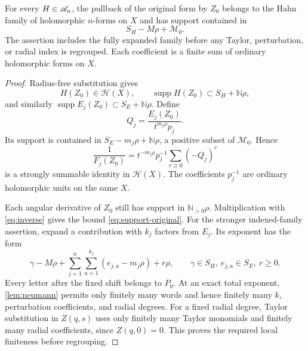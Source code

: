 \documentclass[11pt,letterpaper]{article}
\theoremstyle{definition}
\theoremstyle{remark}
\newcommand{\N}{\mathbb N}\newcommand{\Z}{\mathbb Z}\newcommand{\Q}{\mathbb Q}
\newcommand{\HH}{\mathscr H}\newcommand{\FF}{\mathscr F}
\newcommand{\supp}{\operatorname{supp}}\newcommand{\CT}{\operatorname{CT}}
\numberwithin{equation}{section}
\begin{document}
\begin{proposition}\label{prop:admissible}
For every $H\in\mathscr A_n$, the pullback of the original form by $Z_0$ belongs to
the Hahn family of holomorphic $n$-forms on $X$ and has support contained in
\begin{equation}\label{eq:support-original}
 S_H-M\rho+\mathcal M_0.
\end{equation}
The assertion includes the fully expanded family before any Taylor,
perturbation, or radial index is regrouped. Each coefficient is a finite sum
of ordinary holomorphic forms on $X$.
\end{proposition}
\begin{proof}
Radius-free substitution gives
\[
 H(Z_0)\in\HH(X),\qquad
 \supp H(Z_0)\subset S_H+\N\rho,
\]
and similarly $\supp E_j(Z_0)\subset S_E+\N\rho$. Define
\[
 Q_j=\frac{E_j(Z_0)}{t^{m_j\rho}p_j}.
\]
Its support is contained in $S_E-m_j\rho+\N\rho$, a positive subset of
$\mathcal M_0$. Hence
\begin{equation}\label{eq:inverse}
 \frac1{F_j(Z_0)}
 =t^{-m_j\rho}p_j^{-1}\sum_{r\geq0}(-Q_j)^r
\end{equation}
is a strongly summable identity in $\HH(X)$. The coefficients $p_j^{-1}$
are ordinary holomorphic units on the same $X$.

Each angular derivative of $Z_0$ still has support in $\N_{>0}\rho$.
Multiplication with \eqref{eq:inverse} gives the bound
\eqref{eq:support-original}. For the stronger indexed-family assertion, expand
a contribution with $k_j$ factors from $E_j$. Its exponent has the form
\begin{equation}\label{eq:exponent-accounting}
 \gamma-M\rho+
 \sum_{j=1}^n\sum_{a=1}^{k_j}(e_{j,a}-m_j\rho)+r\rho,
 \qquad \gamma\in S_H,\ e_{j,a}\in S_E,\ r\geq0.
\end{equation}
Every letter after the fixed shift belongs to $P_0$. At an exact total
exponent, \cref{lem:neumann} permits only finitely many words and hence finitely
many $k$, perturbation coefficients, and radial degrees. For a fixed radial
degree, Taylor substitution in $Z(q,s)$ uses only finitely many Taylor
monomials and finitely many radial coefficients, since $Z(q,0)=0$.
This proves the required local finiteness before regrouping.
\end{proof}
\end{document}
